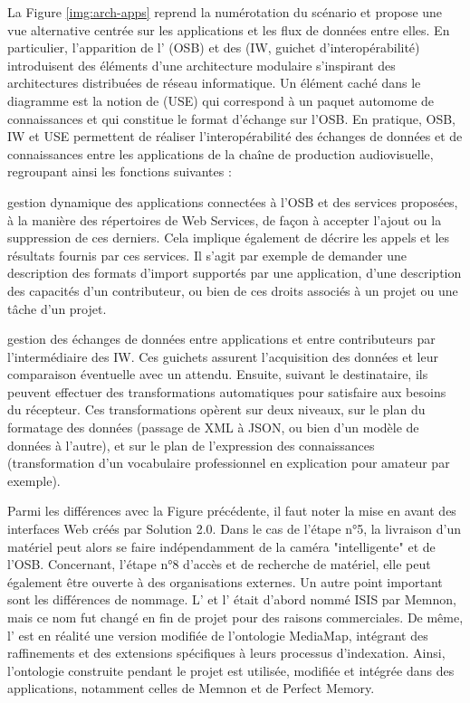 La Figure \ref{img:arch-apps} reprend la numérotation du scénario et propose une vue alternative centrée sur les applications et les flux de données entre elles. 
En particulier, l'apparition de l' (OSB) et des  (IW, guichet d'interopérabilité) introduisent des éléments d'une architecture modulaire s'inspirant des architectures distribuées de réseau informatique.
Un élément caché dans le diagramme est la notion de  (USE) qui correspond à un paquet automome de connaissances et qui constitue le format d'échange sur l'OSB.
En pratique, OSB, IW et USE permettent de réaliser l'interopérabilité des échanges de données et de connaissances entre les applications de la chaîne de production audiovisuelle, regroupant ainsi les fonctions suivantes : 
\begin{liste}
	\item gestion dynamique des applications connectées à l'OSB et des services proposées, à la manière des répertoires de Web Services, de façon à accepter l'ajout ou la suppression de ces derniers.
	Cela implique également de décrire les appels et les résultats fournis par ces services.
	Il s'agit par exemple de demander une description des formats d'import supportés par une application, d'une description des capacités d'un contributeur, ou bien de ces droits associés à un projet ou une tâche d'un projet.

	\item gestion des échanges de données entre applications et entre contributeurs par l'intermédiaire des IW. 
	Ces guichets assurent l'acquisition des données et leur comparaison éventuelle avec un attendu.
	Ensuite, suivant le destinataire, ils peuvent effectuer des transformations automatiques pour satisfaire aux besoins du récepteur. 
	Ces transformations opèrent sur deux niveaux, sur le plan du formatage des données (passage de XML à JSON, ou bien d'un modèle de données à l'autre), et sur le plan de l'expression des connaissances (transformation d'un vocabulaire professionnel en explication pour amateur par exemple).
\end{liste}

Parmi les différences avec la Figure précédente, il faut noter la mise en avant des interfaces Web créés par Solution 2.0. 
Dans le cas de l'étape n°5, la livraison d'un matériel peut alors se faire indépendamment de la caméra "intelligente" et de l'OSB.
Concernant, l'étape n°8 d'accès et de recherche de matériel, elle peut également être ouverte à des organisations externes.
Un autre point important sont les différences de nommage. L' et l' était d'abord nommé ISIS par Memnon, mais ce nom fut changé en fin de projet pour des raisons commerciales. 
De même, l' est en réalité une version modifiée de l'ontologie MediaMap, intégrant des raffinements et des extensions spécifiques à leurs processus d'indexation. 
Ainsi, l'ontologie construite pendant le projet est utilisée, modifiée et intégrée dans des applications, notamment celles de Memnon et de Perfect Memory.




